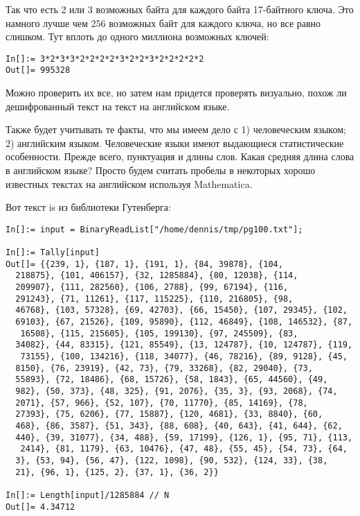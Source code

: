 Так что есть 2 или 3 возможных байта для каждого байта 17-байтного ключа.
Это намного лучше чем 256 возможных байт для каждого ключа, но все равно слишком.
Тут вплоть до одного миллиона возможных ключей:

\begin{lstlisting}[caption=Mathematica,style=custommath]
In[]:= 3*2*3*3*2*2*2*2*3*2*2*3*2*2*2*2*2
Out[]= 995328
\end{lstlisting}

Можно проверить их все, но затем нам придется проверять визуально, похож ли дешифрованный текст на текст на английском языке.

Также будет учитывать те факты, что мы имеем дело с 1) человеческим языком; 2) английским языком.
Человеческие языки имеют выдающиеся статистические особенности.
Прежде всего, пунктуация и длины слов.
Какая средняя длина слова в английском языке?
Просто будем считать пробелы в некоторых хорошо известных текстах на английском используя Mathematica.

Вот текст is \href{http://www.gutenberg.org/cache/epub/100/pg100.txt}{}
из библиотеки Гутенберга:

\begin{lstlisting}[caption=Mathematica,style=custommath]
In[]:= input = BinaryReadList["/home/dennis/tmp/pg100.txt"];

In[]:= Tally[input]
Out[]= {{239, 1}, {187, 1}, {191, 1}, {84, 39878}, {104, 
  218875}, {101, 406157}, {32, 1285884}, {80, 12038}, {114, 
  209907}, {111, 282560}, {106, 2788}, {99, 67194}, {116, 
  291243}, {71, 11261}, {117, 115225}, {110, 216805}, {98, 
  46768}, {103, 57328}, {69, 42703}, {66, 15450}, {107, 29345}, {102, 
  69103}, {67, 21526}, {109, 95890}, {112, 46849}, {108, 146532}, {87,
   16508}, {115, 215605}, {105, 199130}, {97, 245509}, {83, 
  34082}, {44, 83315}, {121, 85549}, {13, 124787}, {10, 124787}, {119,
   73155}, {100, 134216}, {118, 34077}, {46, 78216}, {89, 9128}, {45, 
  8150}, {76, 23919}, {42, 73}, {79, 33268}, {82, 29040}, {73, 
  55893}, {72, 18486}, {68, 15726}, {58, 1843}, {65, 44560}, {49, 
  982}, {50, 373}, {48, 325}, {91, 2076}, {35, 3}, {93, 2068}, {74, 
  2071}, {57, 966}, {52, 107}, {70, 11770}, {85, 14169}, {78, 
  27393}, {75, 6206}, {77, 15887}, {120, 4681}, {33, 8840}, {60, 
  468}, {86, 3587}, {51, 343}, {88, 608}, {40, 643}, {41, 644}, {62, 
  440}, {39, 31077}, {34, 488}, {59, 17199}, {126, 1}, {95, 71}, {113,
   2414}, {81, 1179}, {63, 10476}, {47, 48}, {55, 45}, {54, 73}, {64, 
  3}, {53, 94}, {56, 47}, {122, 1098}, {90, 532}, {124, 33}, {38, 
  21}, {96, 1}, {125, 2}, {37, 1}, {36, 2}}

In[]:= Length[input]/1285884 // N
Out[]= 4.34712
\end{lstlisting}

